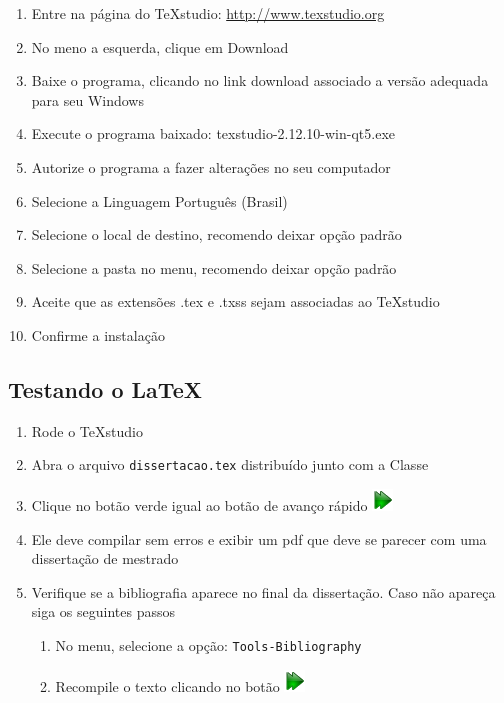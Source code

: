 \documentclass[fleqn]{profmat-cefet}
\newcommand{\TeXstudio}{\TeX\textsf{studio}}
\newcommand{\texfile}  {\texttt{dissertacao.tex}}
\begin{document}
\begin{enumerate}
    \item Entre na página do \TeXstudio{}: \url{http://www.texstudio.org}
    \item No meno a esquerda, clique em Download 
    \item Baixe o programa, clicando no link download associado a versão adequada para seu Windows
    \item Execute o programa baixado: \textsf{texstudio-2.12.10-win-qt5.exe}
    \item Autorize o programa a fazer alterações no seu computador
    \item Selecione a Linguagem \textsf{Português (Brasil)}
    \item Selecione o local de destino, recomendo deixar opção padrão
    \item Selecione a pasta no menu,    recomendo deixar opção padrão
    \item Aceite que as extensões \textsf{.tex} e \textsf{.txss} sejam associadas ao \TeXstudio{}
    \item Confirme a instalação
\end{enumerate}

\subsection{Testando o \LaTeX{}}

\begin{enumerate}
    \item Rode o \TeXstudio{}
    \item Abra o arquivo \texfile{} distribuído junto com a Classe
    \item Clique no botão verde igual ao botão de avanço rápido 
        \includegraphics[height=0.7\baselineskip]{figs/fast-forward}
    \item Ele deve compilar sem erros e exibir um \textsf{pdf} que deve se parecer com uma dissertação de mestrado
    \item Verifique se a bibliografia aparece no final da dissertação. Caso não apareça siga os seguintes passos
    \begin{enumerate}
        \item No menu, selecione a opção: \texttt{Tools-Bibliography}
        \item Recompile o texto clicando no botão 
            \includegraphics[height=0.7\baselineskip]{figs/fast-forward}
    \end{enumerate}
\end{enumerate}
\end{document}

